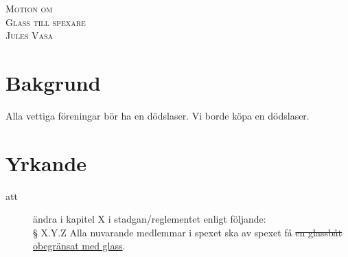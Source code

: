 \documentclass[a4paper,12pt]{article}
\newcommand{\motionsnamn}{Glass till spexare}
\newcommand{\motionar}{Jules Vasa}
\newcommand{\stryk}[1]{\sout{#1}}
\newcommand{\nytt}[1]{\uline{#1}}
\begin{document}
\begin{center}
\textsc{\Huge Motion om}\\[0.5cm]
\textsc{\huge \motionsnamn}\\[0.5cm]
\textsc{\large \motionar\\}

\end{center}

\section{Bakgrund}

Alla vettiga föreningar bör ha en dödslaser. Vi borde köpa en dödslaser.

\section{Yrkande}
\begin{description}
	\item [att] ändra i kapitel X i stadgan/reglementet enligt följande:\\
 § X.Y.Z Alla nuvarande medlemmar i spexet ska av spexet få \stryk{en glassbåt} \nytt{obegränsat med glass}.
\end{description}
\end{document}
